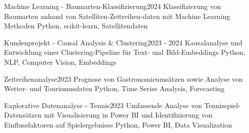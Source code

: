 
\begin{projects}
  \project
    {Machine Learning - Baumarten-Klassifizierung}{2024}
    {}
    {Klassifizierung von Baumarten anhand von Satelliten-Zeitreihen-daten mit Machine Learning Methoden}
    {Python, scikit-learn, Satellitendaten}

  \project
    {Kundenprojekt - Causal Analysis \& Clustering}{2023 - 2024}
    {}
    {Kausalanalyse und Entwicklung einer Clustering-Pipeline für Text- und Bild-Embeddings}
    {Python, NLP, Computer Vision, Embeddings}

  \project
    {Zeitreihenanalyse}{2023}
    {}
    {Prognose von Gastronomieumsätzen sowie Analyse von Wetter- und Tourismusdaten}
    {Python, Time Series Analysis, Forecasting}

  \project
    {Explorative Datenanalyse - Tennis}{2023}
    {}
    {Umfassende Analyse von Tennisspiel-Datensätzen mit Visualisierung in Power BI und Identifizierung von Einflussfaktoren auf Spielergebnisse}
    {Python, Power BI, Data Visualization}
\end{projects}